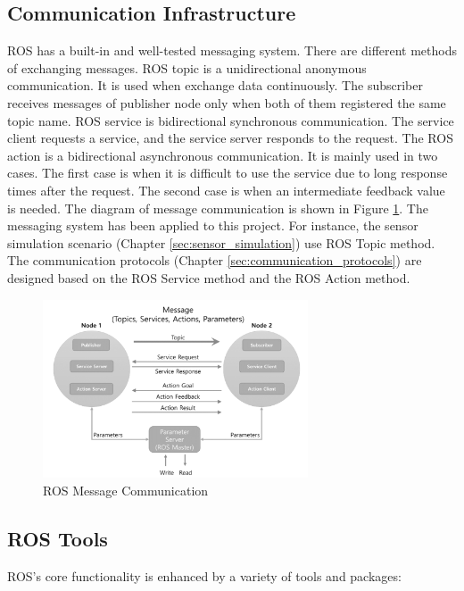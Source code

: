 \subsection{Communication Infrastructure}
ROS has a built-in and well-tested messaging system. There are different methods of exchanging messages. ROS topic is a unidirectional anonymous communication. It is used when exchange data continuously. The subscriber receives messages of publisher node only when both of them registered the same topic name. ROS service is bidirectional synchronous communication. The service client requests a service, and the service server responds to the request. The ROS action is a bidirectional asynchronous communication. It is mainly used in two cases. The first case is when it is difficult to use the service due to long response times after the request. The second case is when an intermediate feedback value is needed.
The diagram of message communication is shown in Figure \ref{fig:ros_message_communication}. The messaging system has been applied to this project. For instance, the sensor simulation scenario (Chapter \ref{sec:sensor_simulation}) use ROS Topic method. The communication protocols (Chapter \ref{sec:communication_protocols}) are designed based on the ROS Service method and the ROS Action method. 

\begin{figure}
 \centering
 \includegraphics[width = 0.7\textwidth]{content/images/ch2/ros_message_communication.png}
 \caption{ROS Message Communication \cite{Pyo17}}
 \label{fig:ros_message_communication}
 \end{figure}
 
\subsection{ROS Tools}
ROS's core functionality is enhanced by a variety of tools and packages:

